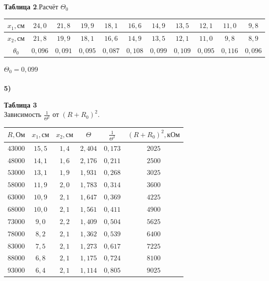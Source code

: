 \documentclass[11pt,a4paper]{article}
\begin{document}
\begin{table}[h!]
	\begin{center}
		\textbf{Таблица 2}.Расчёт $\Theta_0$\\
		\begin{tabular}{|c|c|c|c|c|c|c|c|c|c|c|}
			
			\hline
			$x_1,\text{см}$ & $24,0$  & $21,8$ & $19,9$ & $18,1$ & $16,6$ & $14,9$ & $13,5$ & $12,1$  & $11,0$ & $9,8$ \\ \hline
			$x_2,\text{см}$ & $21,8$ & $19,9$ & $18,1$ & $16,6$ & $14,9$ & $13,5$ & $12,1$  & $11,0$ & $9,8$ & $8,9$ \\ \hline
			$\theta_0$ & $0,096$ & $0,091$ & $0,095$ & $0,087$ & $0,108$ & $0,099$ & $0,109$  & $0,095$ & $0,116$ & $0,096$ \\ \hline
	\end{tabular}
\end{center}
\end{table}
$\boxed{\Theta_0 = 0,099}$ \\\\
\textbf{5)}
\begin{table}[h!]
	\begin{center}
		\textbf{Таблица 3} \\
		Зависимость $\frac{1}{\Theta^2}$ от $(R+R_0)^2$.\\
		\begin{tabular}{|c|c|c|c|c|c|}
			\hline
		 $R, \text{Ом}$ & $x_1, \text{см}$ &$x_2, \text{см}$ & $\Theta$ & $\frac{1}{\Theta^2}$ & $(R+R_0)^2, \text{кОм}$ \\ \hline
			$43000$ &	$15,5$ & $1,4$ & $2,404$ & $0,173$ & $2025$ \\ \hline
			$48000$	& $14,1$ & $1,6$ & $2,176$ & $0,211$ & $2500$ \\ \hline
			$53000$	& $13,1$ & $1,9$ & $1,931$ & $0,268$ & $3025$ \\ \hline
			$58000$	& $11,9$ & $2,0$ & $1,783$ & $0,314$ & $3600$ \\ \hline
			$63000$	& $10,9$ & $2,1$ & $1,647$ & $0,369$ & $4225$ \\ \hline
			$68000$	& $10,0$ & $2,1$ & $1,561$ & $0,411$ & $4900$ \\ \hline
			$73000$	& $9,0$ &  $2,2$ &$1,409$	& $0,504$ & $5625$ \\ \hline
			$78000$	& $8,2$ & $2,1$ & $1,362$ & $0,539$ & $6400$ \\ \hline
			$83000$	& $7,5$ & $2,1$ & $1,273$ & $0,617$ & $7225$ \\ \hline
			$88000$	& $6,8$	& $2,1$ & $1,175$ & $0,724$ & $8100$ \\ \hline
			$93000$	& $6,4$ & $2,1$ & $1,114$ & $0,805$ & $9025$ \\ \hline
		\end{tabular}
	\end{center}
\end{table}
\end{document}

